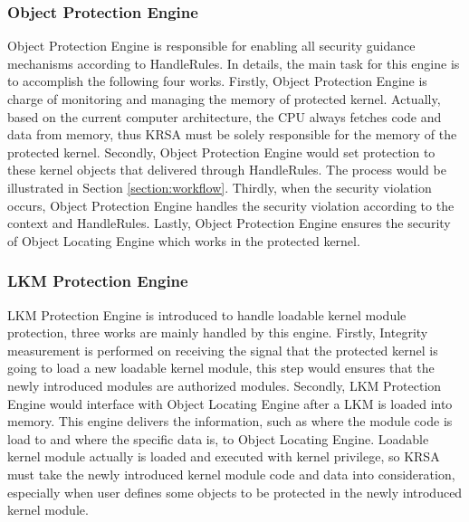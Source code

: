 \documentclass[conference]{IEEEtran}
\begin{document}
\subsubsection{Object Protection Engine}
Object Protection Engine is responsible for enabling all security guidance mechanisms according to HandleRules. In details, the main task for this engine is to accomplish the following four works. 
Firstly, Object Protection Engine is charge of monitoring and managing the memory of protected kernel. Actually, based on the current computer architecture, the CPU always fetches code and data from memory, 
thus KRSA must be solely responsible for the memory of the protected kernel. Secondly, Object Protection Engine would set protection to these kernel objects that delivered through HandleRules. The process would be illustrated in Section \ref{section:workflow}. 
Thirdly, when the security violation occurs, Object Protection Engine handles the security violation according to the context and HandleRules. 
Lastly, Object Protection Engine ensures the security of Object Locating Engine which works in the protected kernel.

\subsubsection{LKM Protection Engine}
LKM Protection Engine is introduced to handle loadable kernel module protection, three works are mainly handled by this engine. Firstly, Integrity measurement is performed on receiving the signal that the protected kernel is going to load a new loadable kernel module, this step would ensures that the newly introduced modules are authorized modules. Secondly, LKM Protection Engine would interface with Object Locating Engine after a LKM is loaded into memory. This engine delivers the information, such as where the module code is load to and where the specific data is, to Object Locating Engine. Loadable kernel module actually is loaded and executed with kernel privilege, so KRSA must take the newly introduced kernel module code and data into consideration, especially when user defines some objects to be protected in the newly introduced kernel module. 
\end{document}
